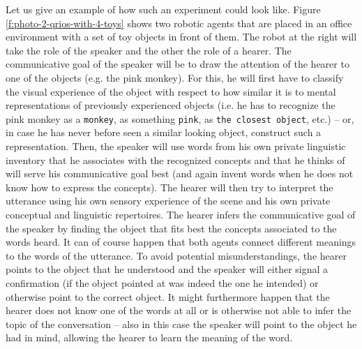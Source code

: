 Let us give an example of how such an experiment could look
like. Figure \ref{f:photo-2-qrios-with-4-toys} shows two robotic
agents that are placed in an office environment with a set of toy
objects in front of them. The robot at the right will take the role of
the speaker and the other the role of a hearer. The communicative goal
of the speaker will be to draw the attention of the hearer to one of
the objects (e.g. the pink monkey). For this, he will first have to
classify the visual experience of the object with respect to how
similar it is to mental representations of previously experienced
objects (i.e. he has to recognize the pink monkey as a {\tt monkey},
as something {\tt pink}, as {\tt the closest object}, etc.) -- or, in
case he has never before seen a similar looking object, construct such
a representation. Then, the speaker will use words from his own
private linguistic inventory that he associates with the recognized
concepts and that he thinks of will serve his communicative goal best
(and again invent words when he does not know how to express the
concepts). The hearer will then try to interpret the utterance using
his own sensory experience of the scene and his own private conceptual
and linguistic repertoires. The hearer infers the communicative goal
of the speaker by finding the object that fits best the concepts
associated to the words heard. It can of course happen that both
agents connect different meanings to the words of the utterance. To
avoid potential misunderstandings, the hearer points to the object
that he understood and the speaker will either signal a confirmation
(if the object pointed at was indeed the one he intended) or otherwise
point to the correct object. It might furthermore happen that the
hearer does not know one of the words at all or is otherwise not able
to infer the topic of the conversation -- also in this case the
speaker will point to the object he had in mind, allowing the hearer
to learn the meaning of the word.



